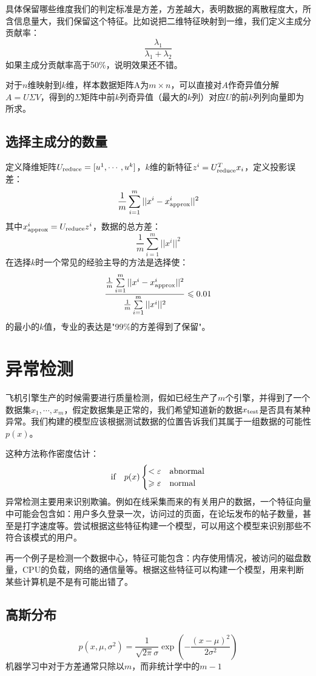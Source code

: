 \documentclass[cn,hazy,blue,normal,14pt]{elegantnote}
\begin{document}
具体保留哪些维度我们的判定标准是方差，方差越大，表明数据的离散程度大，所含信息量大，我们保留这个特征。比如说把二维特征映射到一维，我们定义主成分贡献率：
$$
\frac{\lambda_1}{\lambda_1+\lambda_2}
$$
如果主成分贡献率高于50\%，说明效果还不错。
\begin{note}
对于$n$维映射到$k$维，样本数据矩阵A为$m\times n$，可以直接对$A$作奇异值分解$A=U\Sigma V$，得到的$\Sigma$矩阵中前$k$列奇异值（最大的$k$列）对应$U$的前$k$列列向量即为所求。
\end{note}
\subsection{选择主成分的数量}
定义降维矩阵$U_{\rm{reduce}}=[u^1,\cdots,u^k]$，$k$维的新特征$z^i=U_{\rm{reduce}}^T x_i$，定义投影误差：
$$
\frac{1}{m}\sum_{i=1}^m ||x^i-x_{\rm{approx}}^i||^2
$$
其中$x_{\rm{approx}}^i=U_{\rm{reduce}}z^i$，数据的总方差：
$$
\frac{1}{m}\sum_{i=1}^m ||x^i||^2
$$
在选择$k$时一个常见的经验主导的方法是选择使：
$$
\frac{\frac{1}{m}\sum\limits_{i=1}^m ||x^i-x_{\rm{approx}}^i||^2}{\frac{1}{m}\sum\limits_{i=1}^m ||x^i||^2} \leqslant 0.01
$$
的最小的$k$值，专业的表达是"99\%的方差得到了保留"。
\section{异常检测}
\begin{example}
飞机引擎生产的时候需要进行质量检测，假如已经生产了$m$个引擎，并得到了一个数据集$x_1,\cdots,x_m$，假定数据集是正常的，我们希望知道新的数据$x_{\rm{test}}$是否具有某种异常。我们构建的模型应该根据测试数据的位置告诉我们其属于一组数据的可能性$p(x)$。
\end{example}

这种方法称作密度估计：
$$
\text{if} \quad p(x)
\begin{cases}
    < \varepsilon &\rm{abnormal} \\
    \geqslant \varepsilon &\rm{normal}
\end{cases}
$$
异常检测主要用来识别欺骗。例如在线采集而来的有关用户的数据，一个特征向量中可能会包含如：用户多久登录一次，访问过的页面，在论坛发布的帖子数量，甚至是打字速度等。尝试根据这些特征构建一个模型，可以用这个模型来识别那些不符合该模式的用户。

再一个例子是检测一个数据中心，特征可能包含：内存使用情况，被访问的磁盘数量，CPU的负载，网络的通信量等。根据这些特征可以构建一个模型，用来判断某些计算机是不是有可能出错了。
\subsection{高斯分布}
$$
p(x,\mu,\sigma^2)=\frac{1}{\sqrt{2\pi}\sigma}\exp{(-\frac{(x-\mu)^2}{2\sigma^2})}
$$
机器学习中对于方差通常只除以$m$，而非统计学中的$m-1$
\end{document}
